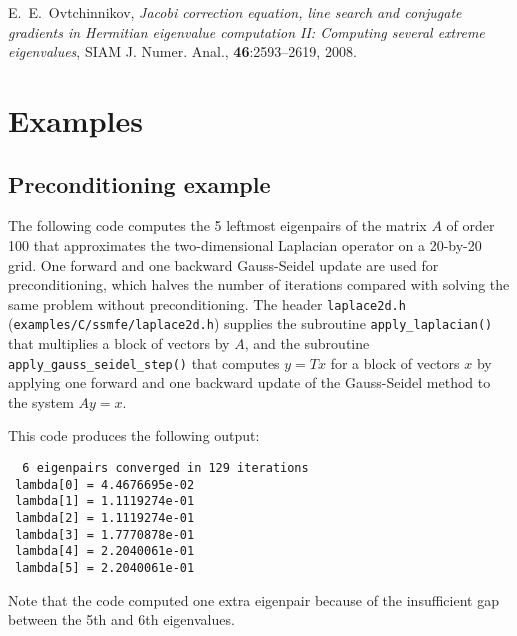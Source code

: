\noindent
[3]
E.~E.~Ovtchinnikov,
{\em Jacobi correction equation, line search and
conjugate gradients in Hermitian eigenvalue computation II:
Computing several extreme eigenvalues},
SIAM J. Numer. Anal., {\bf 46}:2593--2619, 2008.

\section{Examples}

\subsection{Preconditioning example}

The following code 
computes the 5 leftmost eigenpairs of 
the matrix $A$ of order 100 that approximates 
the two-dimensional Laplacian operator
on a 20-by-20 grid.
One forward and one backward Gauss-Seidel update
are used for preconditioning,
which halves the number of iterations
compared with solving the same problem without preconditioning.
The header {\tt laplace2d.h} (\texttt{examples/C/ssmfe/laplace2d.h})
supplies the subroutine {\tt apply\_laplacian()}
that multiplies a block of vectors by $A$,
and the subroutine 
{\tt apply\_gauss\_seidel\_step()}
that computes $y = T x$ for a block of vectors $x$
by applying one forward and one backward update
of the Gauss-Seidel method to the system $A y = x$.

This code produces the following output:
\begin{verbatim}
  6 eigenpairs converged in 129 iterations
 lambda[0] = 4.4676695e-02
 lambda[1] = 1.1119274e-01
 lambda[2] = 1.1119274e-01
 lambda[3] = 1.7770878e-01
 lambda[4] = 2.2040061e-01
 lambda[5] = 2.2040061e-01
\end{verbatim}

Note that the code computed one extra eigenpair
because of the insufficient gap between the 5th and 6th
eigenvalues.
